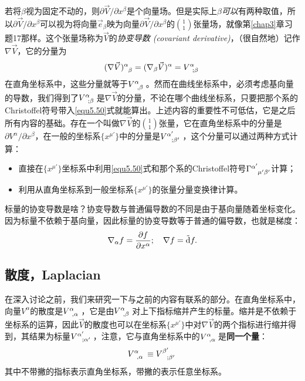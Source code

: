 若将$\beta$视为固定不动的，则$\partial \vec{V} / \partial x^\beta$是个向量场。但是实际上$\beta$\textit{可以}有两种取值，所以$\partial \vec{V} / \partial x^\beta$可以视为将向量$\vec{e}_\beta$映为向量$\partial \vec{V} / \partial x^\beta$的$\binom{1}{1}$张量场，就像第\ref{chap3}章习题17那样。这个张量场称为$\vec{V}$的\textit{协变导数 (covariant derivative)}，（很自然地）记作$\nabla \vec{V}$，它的分量为
\begin{equation}
    (\nabla \vec{V})\indices{^\alpha_\beta} = (\nabla_\beta \vec{V})\indices{^\alpha} = V\indices{^\alpha_{; \beta}} 
\label{equ5.52}
\end{equation}
在直角坐标系中，这些分量就等于$V\indices{^\alpha_{, \beta}}$。然而在曲线坐标系中，必须考虑基向量的导数，我们得到了$V\indices{^\alpha_{; \beta}}$是$\nabla \vec{V}$的分量，不论在哪个曲线坐标系，只要把那个系的Christoffel符号带入\eqref{equ5.50}式就能算出。上述内容的重要性不可低估，它是之后所有内容的基础。存在一个叫做$\nabla \vec{V}$的$\binom{1}{1}$张量，它在直角坐标系中的分量是$\partial V^\alpha / \partial x^\beta$，在一般的坐标系$\{ x^{\mu'} \}$中的分量是$V\indices{^{\alpha'}_{; \beta'}}$，这个分量可以通过两种方式计算：
\begin{itemize}
\item 直接在$\{ x^{\mu'} \}$坐标系中利用\eqref{equ5.50}式和那个系的Christoffel符号$\Gamma\indices{^{\alpha'}_{\mu' \beta'}}$计算；
\item 利用从直角坐标系到一般坐标系$\{ x^{\mu'} \}$的张量分量变换律计算。
\end{itemize}

标量的协变导数是啥？协变导数与普通偏导数的不同是由于基向量随着坐标变化。因为标量不依赖于基向量，因此标量的协变导数等于普通的偏导数，也就是梯度：
\begin{equation}
    \nabla_\alpha f = \frac{\partial f}{\partial x^\alpha}; \quad \nabla f = \tilde{\mathrm{d}} f.
\label{equ5.53}
\end{equation}


\subsection*{散度，Laplacian}
在深入讨论之前，我们来研究一下与之前的内容有联系的部分。在直角坐标系中，向量$V^\alpha$的散度是$V\indices{^\alpha_{, \alpha}}$，它是由$V\indices{^\alpha_{, \beta}}$对上下指标缩并产生的标量。缩并是不依赖于坐标系的运算，因此$\vec{V}$的散度也可以在坐标系$\{ x^{\mu'} \}$中对$\nabla \vec{V}$的两个指标进行缩并得到，其结果为标量$V\indices{^{\alpha'}_{; \alpha'}}$，注意，它与直角坐标系中的$V\indices{^\alpha_{, \alpha}}$是\textbf{同一个量}：
\begin{equation}
    V\indices{^\alpha_{, \alpha}} \equiv V\indices{^{\beta'}_{; \beta'}}
\label{equ5.54}
\end{equation}
其中不带撇的指标表示直角坐标系，带撇的表示任意坐标系。

